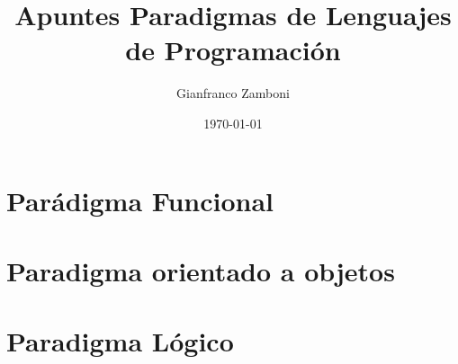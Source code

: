 \documentclass[10pt,a4paper]{article}
\begin{document}
\title{Apuntes Paradigmas de Lenguajes de Programación}

\date{\today}

\author{Gianfranco Zamboni}
\begin{titlepage}
    \maketitle
    \thispagestyle{empty}
    \tableofcontents
\end{titlepage}

\newpage
\setcounter{page}{1}


\newpage
\part{Parádigma Funcional}



\newpage


\newpage


\newpage


\newpage
\part{Paradigma orientado a objetos}


\newpage


\newpage


\newpage
\part{Paradigma Lógico}



\newpage


\newpage

\appendix
\newpage

\end{document}
